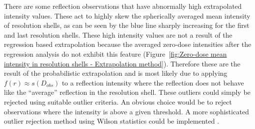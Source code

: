 There are some reflection observations that have abnormally high extrapolated intensity values.
These act to highly skew the spherically averaged mean intensity of resolution shells, as can be seen by the blue line sharply increasing for the first and last resolution shells.
These high intensity values are not a result of the regression based extrapolation because the averaged zero-dose intensities after the regression analysis do not exhibit this feature (Figure~\ref{fig:Zero-dose mean intensity in resolution shells - Extrapolation method}).
Therefore these are the result of the probabilistic extrapolation and is most likely due to applying $f(r) \approx s(D_{obs})$ to a reflection intensity where the reflection does not behave like the ``average'' reflection in the resolution shell.
These outliers could simply be rejected using suitable outlier criteria.
An obvious choice would be to reject observations where the intensity is above a given threshold.
A more sophisticated outlier rejection method using Wilson statistics could be implemented \cite{read1999detecting}.
